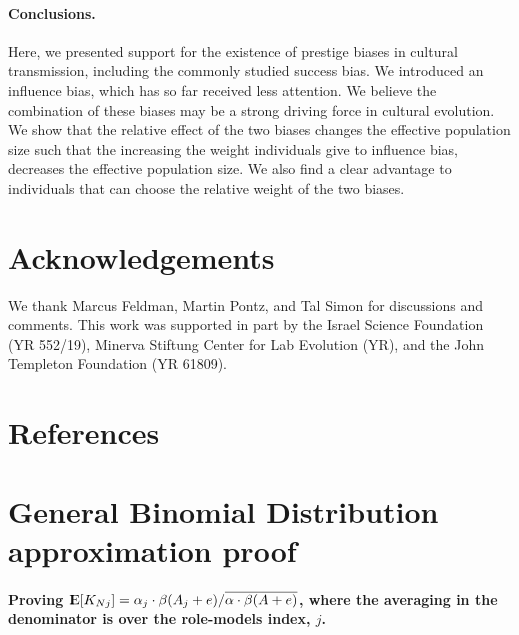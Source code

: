 \documentclass[12pt]{extarticle}
\DeclareMathOperator*{\E}{{\rm I\kern-.3em E}}
\begin{document}
\paragraph{Conclusions.}
Here, we presented support for the existence of prestige biases in cultural transmission, including the commonly studied success bias. We introduced an influence bias, which has so far received less attention. We believe the combination of these biases may be a strong driving force in cultural evolution. 
We show that the relative effect of the two biases changes the effective population size such that the increasing the weight individuals give to influence bias, decreases the effective population size. 
We also find a clear advantage to individuals that can choose the relative weight of the two biases.

{\small
\section{Acknowledgements}
We thank Marcus Feldman, Martin Pontz, and Tal Simon for discussions and comments.
This work was supported in part by 
the Israel Science Foundation (YR 552/19),
Minerva Stiftung Center for Lab Evolution (YR),
and 
the John Templeton Foundation (YR 61809).
}

\section{References}
\nolinenumbers

%


\pagebreak

\appendix
\section{General Binomial Distribution approximation proof}\label{append:GBD}

\paragraph{Proving $\E[K_{Nj}] = \alpha_j \cdot \beta(A_j+e) / \overline{\alpha \cdot \beta(A+e)}$, where the averaging in the denominator is over the role-models index, $j$.}
\end{document}
